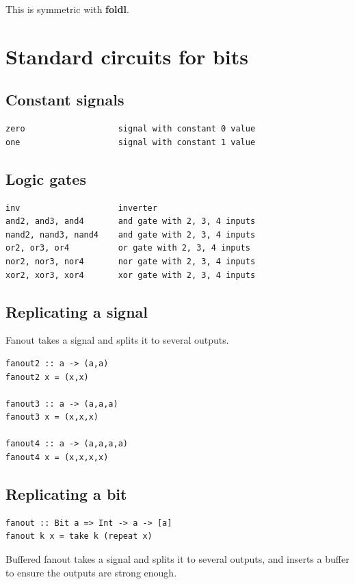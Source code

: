 \documentclass[]{svmono}
\begin{document}
This is symmetric with \textbf{foldl}.
\section*{Standard circuits for bits}
\label{sec:org86f399e}

\subsection*{Constant signals}
\label{sec:org4abbf9e}

\begin{verbatim}
zero                   signal with constant 0 value
one                    signal with constant 1 value
\end{verbatim}
\subsection*{Logic gates}
\label{sec:orgfde4f4e}

\begin{verbatim}
inv                    inverter
and2, and3, and4       and gate with 2, 3, 4 inputs
nand2, nand3, nand4    and gate with 2, 3, 4 inputs
or2, or3, or4          or gate with 2, 3, 4 inputs
nor2, nor3, nor4       nor gate with 2, 3, 4 inputs
xor2, xor3, xor4       xor gate with 2, 3, 4 inputs
\end{verbatim}
\subsection*{Replicating a signal}
\label{sec:orged2cd27}

Fanout takes a signal and splits it to several outputs.

\begin{verbatim}
fanout2 :: a -> (a,a)
fanout2 x = (x,x)

fanout3 :: a -> (a,a,a)
fanout3 x = (x,x,x)

fanout4 :: a -> (a,a,a,a)
fanout4 x = (x,x,x,x)
\end{verbatim}
\subsection*{Replicating a bit}
\label{sec:orgf05c7d0}

\begin{verbatim}
fanout :: Bit a => Int -> a -> [a]
fanout k x = take k (repeat x)
\end{verbatim}


Buffered fanout takes a signal and splits it to several outputs, and
inserts a buffer to ensure the outputs are strong enough.
\end{document}
